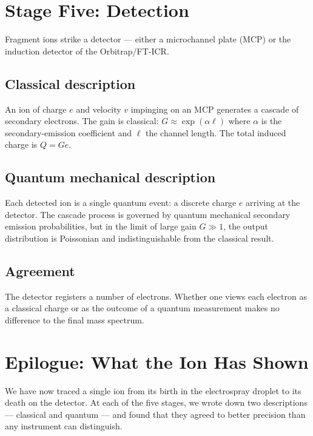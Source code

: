 \section{Stage Five: Detection}
\label{sec:ch1-detection}

Fragment ions strike a detector --- either a microchannel plate (MCP) or the
induction detector of the Orbitrap/FT-ICR.

\subsection*{Classical description}
An ion of charge $e$ and velocity $v$ impinging on an MCP generates a
cascade of secondary electrons.
The gain is classical: $G \approx \exp(\alpha \ell)$ where $\alpha$ is the
secondary-emission coefficient and $\ell$ the channel length.
The total induced charge is $Q = Ge$.

\subsection*{Quantum mechanical description}
Each detected ion is a single quantum event: a discrete charge $e$ arriving at
the detector.
The cascade process is governed by quantum mechanical secondary emission
probabilities, but in the limit of large gain $G \gg 1$, the output distribution
is Poissonian and indistinguishable from the classical result.

\subsection*{Agreement}
The detector registers a number of electrons.
Whether one views each electron as a classical charge or as the outcome of a
quantum measurement makes no difference to the final mass spectrum.

\section{Epilogue: What the Ion Has Shown}
\label{sec:ch1-epilogue}

We have now traced a single ion from its birth in the electrospray droplet to
its death on the detector.
At each of the five stages, we wrote down two descriptions --- classical and
quantum --- and found that they agreed to better precision than any instrument
can distinguish.

